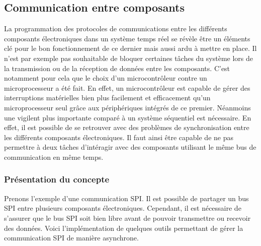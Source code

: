 \subsection{Communication entre composants}


La programmation des protocoles de communications entre les différents composants
électroniques dans un système temps réel se révèle être un éléments clé pour le bon
fonctionnement de ce dernier mais aussi ardu à mettre en place. Il n'est par exemple
pas souhaitable de bloquer certaines tâches du système lors de la transmission ou
de la réception de données entre les composants. C'est notamment pour cela que le
choix d'un microcontrôleur contre un microprocesseur a été fait. En effet, un
microcontrôleur est capable de gérer des interruptions matérielles bien plus
facilement et efficacement qu'un microprocesseur seul grâce aux périphériques
intégrés de ce premier. Néanmoins une vigilent plus importante comparé à un
système séquentiel est nécessaire. En effet, il est possible de se retrouver avec
des problèmes de synchronisation entre les différents composants électroniques. Il
faut ainsi être capable de ne pas permettre à deux tâches d'intéragir avec des
composants utilisant le même bus de communication en même temps.\\

\subsubsection{Présentation du concepte}

Prenons l'exemple d'une communication SPI. Il est possible de partager un bus SPI
entre plusieurs composants électroniques. Cependant, il est nécessaire de s'assurer
que le bus SPI soit bien libre avant de pouvoir transmettre ou recevoir des données.
Voici l'implémentation de quelques outils permettant de gérer la communication SPI
de manière asynchrone.

